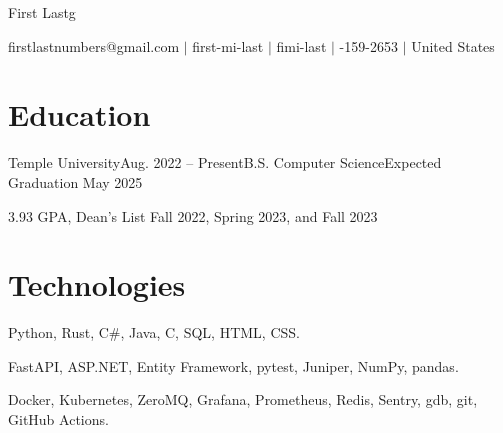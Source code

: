 \documentclass[letterpaper,11pt]{article}
\makeatletter
\newcommand{\myemail}{firstlastnumbers@gmail.com}
\newcommand{\myname}{First Lastg}
\newcommand{\mygh}{first-mi-last}
\newcommand{\mylinkedin}{fimi-last}
\newcommand{\myphone}{314-159-2653}
\newcommand{\mylocation}{United States}
\newcommand{\myemail}{jonathanzhang929@gmail.com}
\newcommand{\myname}{Jonathan Zhang}
\newcommand{\mygh}{jonathan-d-zhang}
\newcommand{\mylinkedin}{jd-zhang}
\newcommand{\myphone}{484-986-8012}
\newcommand{\mylocation}{Philadelphia, PA}
\makeatother
\begin{document}
{\Huge \myname}
\\
\vspace{2pt}

\small{
    \faEnvelope
    \thinspace \thinspace
    \myemail
    \thinspace \thinspace $|$
    \faGithub
    \thinspace \thinspace
    \mygh
    \thinspace \thinspace $|$
    \faLinkedin
    \thinspace \thinspace
    \mylinkedin
    \thinspace \thinspace $|$
    \faPhone
    \thinspace \thinspace
    \myphone
    \thinspace \thinspace $|$
    \thinspace \thinspace
    \mylocation
}

\vspace{-8pt}

\section{Education}
\begin{entries}
    \item\begin{experience}{Temple University}{Aug. 2022 -- Present}{B.S. Computer Science}{Expected Graduation May 2025}
        \item 3.93 GPA, Dean's List Fall 2022, Spring 2023, and Fall 2023
    \end{experience}
\end{entries}

\section{Technologies}
\begin{description}[nosep, labelindent=0.15in]
    \item[Programming Languages:]
        Python,
        Rust,
        C\#,
        Java,
        C,
        SQL,
        HTML,
        CSS.
    \item[Libraries:]
        FastAPI,
        ASP.NET,
        Entity Framework,
        pytest,
        Juniper,
        NumPy,
        pandas.
    \item[Tools:]
        Docker,
        Kubernetes,
        ZeroMQ,
        Grafana,
        Prometheus,
        Redis,
        Sentry,
        gdb,
        git,
        GitHub Actions.
\end{description}
\end{document}
